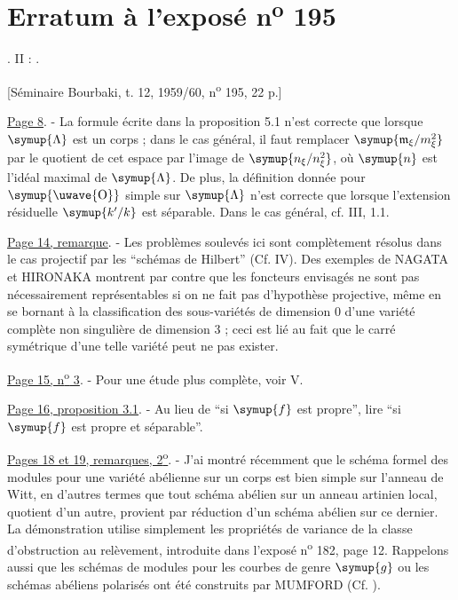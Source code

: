 \clearpage
\chapter*{Erratum à l'exposé n\textsuperscript{o} 195}
\setcounter{footnote}{0}

.  II : .

\begin{center}
[Séminaire Bourbaki, t. 12, 1959/60, n\textsuperscript{o} 195, 22 p.]
\end{center}

\noindent\uline{Page 8}. - La formule écrite dans la proposition 5.1 n'est
correcte que lorsque $\symup{\Lambda}$ est un corps ; dans le cas général, il faut
remplacer $\symup{\mathfrak m_\xi/m_\xi^2}$ par le quotient de cet espace par
l'image de $\symup{n_\xi/n_\xi^2}$, où $\symup{n}$ est l'idéal
maximal de $\symup{\Lambda}$. De plus, la définition donnée pour $\symup{\text{\uwave{O}}}$ simple sur
$\symup{\Lambda}$ n'est correcte que lorsque l'extension résiduelle $\symup{k'/k}$ est
séparable. Dans le cas général, cf.  III, 1.1.

\noindent\uline{Page 14, remarque}. - Les problèmes soulevés ici sont
complètement résolus dans le cas projectif par les ``schémas de Hilbert''
(Cf.  IV). Des exemples de NAGATA et HIRONAKA montrent par contre que les
foncteurs envisagés ne sont pas nécessairement représentables si on ne fait
pas d'hypothèse projective, même en se bornant à la classification des
sous-variétés de dimension 0 d'une variété complète non singulière de
dimension 3 ; ceci est lié au fait que le carré symétrique d'une telle variété
peut ne pas exister.

\noindent\uline{Page 15, n\textsuperscript{o} 3}. - Pour une étude plus
complète, voir  V.

\noindent\uline{Page 16, proposition 3.1}. - Au lieu de ``si $\symup{f}$ est
propre'', lire ``si $\symup{f}$ est propre et séparable''.

\noindent\uline{Pages 18 et 19, remarques, 2\textsuperscript{o}}. - J'ai
montré récemment que le schéma formel des modules pour une variété abélienne
sur un corps est bien simple sur l'anneau de Witt, en d'autres termes que tout
schéma abélien sur un anneau artinien local, quotient d'un autre, provient par
réduction d'un schéma abélien sur ce dernier. La démonstration utilise
simplement les propriétés de variance de la classe d'obstruction au relèvement,
introduite dans l'exposé n\textsuperscript{o} 182, page 12. Rappelons aussi que
les schémas de modules pour les courbes de genre $\symup{g}$ ou les schémas abéliens
polarisés ont été construits par MUMFORD (Cf. ).

